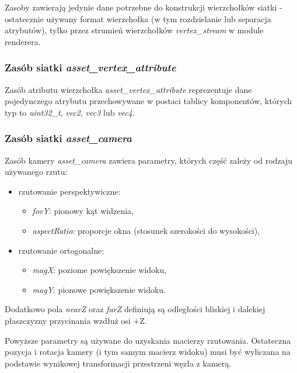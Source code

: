 Zasoby zawierają jedynie dane potrzebne do konstrukcji wierzchołków siatki - ostatecznie używany format wierzchołka (w tym rozdzielanie lub separacja atrybutów), tylko przez strumień wierzchołków \textit{vertex\_stream} w module renderera.

\subsubsection{Zasób siatki \textit{asset\_vertex\_attribute}}
Zasób atributu wierzchołka \textit{asset\_vertex\_attribute} reprezentuje dane pojedynczego atrybutu przechowywane w postaci tablicy komponentów, których typ to \textit{uint32\_t}, \textit{vec2}, \textit{vec3} lub \textit{vec4}.

\subsubsection{Zasób siatki \textit{asset\_camera}}
Zasób kamery \textit{asset\_camera} zawiera parametry, których część zależy od rodzaju używanego rzutu:
\begin{itemize}
	\item rzutowanie perspektywiczne:
	\begin{itemize}
		\item \textit{fovY}: pionowy kąt widzenia,
		\item \textit{aspectRatio}: proporcje okna (stosunek szerokości do wysokości),
	\end{itemize}
	\item rzutowanie ortogonalne:
		\begin{itemize}
		\item \textit{magX}: poziome powiększenie widoku,
		\item \textit{magY}: pionowe powiększenie widoku.
	\end{itemize}
\end{itemize}
Dodatkowo pola \textit{nearZ} oraz \textit{farZ} definiują są odległości bliskiej i dalekiej płaszczyzny przycinania wzdłuż osi +Z.

Powyższe parametry są używane do uzyskania macierzy rzutowania.
Ostateczna pozycja i rotacja kamery (i tym samym macierz widoku) musi być wyliczana na podstawie wynikowej transformacji przestrzeni węzła z kamerą.

